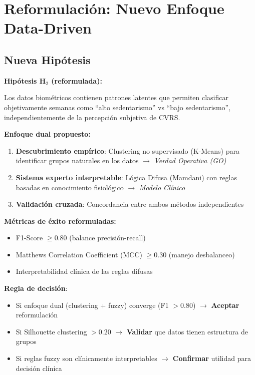 \documentclass[12pt,letterpaper,twoside]{report}
\begin{document}
\section{Reformulación: Nuevo Enfoque Data-Driven}

\subsection{Nueva Hipótesis}

\begin{hipotesisbox}
\textbf{Hipótesis H$_2$ (reformulada):}

Los datos biométricos contienen patrones latentes que permiten clasificar objetivamente semanas como ``alto sedentarismo'' vs ``bajo sedentarismo'', independientemente de la percepción subjetiva de CVRS.

\textbf{Enfoque dual propuesto:}
\begin{enumerate}[noitemsep]
    \item \textbf{Descubrimiento empírico}: Clustering no supervisado (K-Means) para identificar grupos naturales en los datos $\to$ \textit{Verdad Operativa (GO)}
    \item \textbf{Sistema experto interpretable}: Lógica Difusa (Mamdani) con reglas basadas en conocimiento fisiológico $\to$ \textit{Modelo Clínico}
    \item \textbf{Validación cruzada}: Concordancia entre ambos métodos independientes
\end{enumerate}
\end{hipotesisbox}

\begin{estadisticobox}
\textbf{Métricas de éxito reformuladas:}

\begin{itemize}[noitemsep]
    \item F1-Score $\geq 0.80$ (balance precisión-recall)
    \item Matthews Correlation Coefficient (MCC) $\geq 0.30$ (manejo desbalanceo)
    \item Interpretabilidad clínica de las reglas difusas
\end{itemize}
\end{estadisticobox}

\begin{reglabox}
\textbf{Regla de decisión}:

\begin{itemize}[noitemsep]
    \item Si enfoque dual (clustering + fuzzy) converge (F1 $> 0.80$) $\to$ \textbf{Aceptar} reformulación
    \item Si Silhouette clustering $> 0.20$ $\to$ \textbf{Validar} que datos tienen estructura de grupos
    \item Si reglas fuzzy son clínicamente interpretables $\to$ \textbf{Confirmar} utilidad para decisión clínica
\end{itemize}
\end{reglabox}
\end{document}
